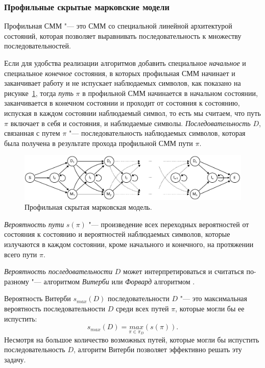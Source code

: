 \documentclass[specialist,
substylefile = spbu_report.rtx,
subf,href,colorlinks=true, 12pt]{disser}
\begin{document}
			\subsubsection{Профильные скрытые марковские модели}
			Профильная СММ "--- это СММ со специальной линейной архитектурой состояний, которая позволяет выравнивать последовательность к множеству последовательностей.						
									
			Если для удобства реализации алгоритмов добавить специальное \textit{начальное} и специальное \textit{конечное} состояния, в которых профильная СММ начинает и заканчивает работу и не испускает наблюдаемых символов, как показано на рисунке~\ref{fg:3}, тогда \textit{путь} $\pi$ в профильной СММ начинается в начальном состоянии, заканчивается в конечном состоянии и проходит от состояния к состоянию, испуская в каждом состоянии наблюдаемый символ, то есть мы считаем, что путь $\pi$ включает в себя и состояния, и наблюдаемые символы. \textit{Последовательность} $D$, связанная с путем $\pi$ "--- последовательность наблюдаемых символов, которая была получена в результате прохода профильной СММ пути $\pi$. 
			
			\begin{figure}[h]
				\includegraphics[width=15cm]{figure2}
				\centering
				\caption{Профильная скрытая марковская модель.}  \label{fg:3}
			\end{figure}
						
			\textit{Вероятность пути} $s(\pi)$ "--- произведение всех переходных вероятностей от состояния к состоянию и вероятностей наблюдаемых символов, которые излучаются в каждом состоянии, кроме начального и конечного, на протяжении всего пути $\pi$. 
			
			\textit{Вероятность последовательности} $D$ может интерпретироваться и считаться по-разному "--- алгоритмом \textit{Витерби} или \textit{Форвард} алгоритмом \cite{Dugad1996, Compeau2015a}.
			
			Вероятность Витерби $s_{max}(D)$ последовательности $D$ "--- это максимальная вероятность последовательности $D$ среди всех путей $\pi$, которые могли бы ее испустить:
			\begin{equation*}
				s_{max}(D) = \underset{\pi \in \pi_{D}}{max}(s(\pi)). \label{eq:1}
			\end{equation*}
			Несмотря на большое количество возможных путей, которые могли бы испустить последовательность $D$, алгоритм Витерби позволяет эффективно решать эту задачу.
			
\end{document}
